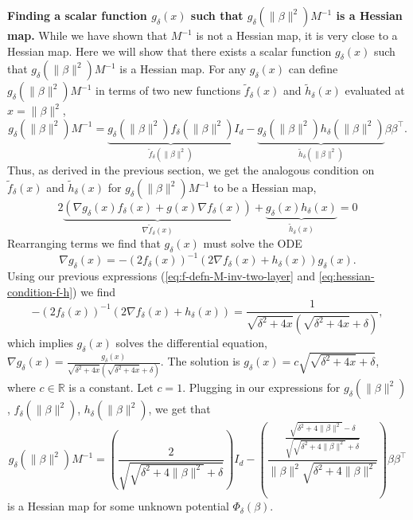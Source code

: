\documentclass{article}
\theoremstyle{plain}
\theoremstyle{definition}
\theoremstyle{remark}
\begin{document}
\textbf{Finding a scalar function $g_\delta(x)$ such that $g_\delta(\|\beta\|^2)M^{-1}$ is a Hessian map.}
%
While we have shown that $M^{-1}$ is not a Hessian map, it is very close to a Hessian map.
%
Here we will show that there exists a scalar function $g_\delta(x)$ such that $g_\delta\left(\|\beta\|^2\right)M^{-1}$ is a Hessian map.
%
For any $g_\delta(x)$ can define $g_\delta\left(\|\beta\|^2\right)M^{-1}$ in terms of two new functions $\tilde{f}_\delta(x)$ and $\tilde{h}_\delta(x)$ evaluated at $x = \|\beta\|^2$,
\begin{equation}
    g_\delta\left(\|\beta\|^2\right)M^{-1} = \underbrace{g_\delta\left(\|\beta\|^2\right)f_\delta\left(\|\beta\|^2\right)}_{\tilde{f}_\delta\left(\|\beta\|^2\right)}I_d - \underbrace{g_\delta\left(\|\beta\|^2\right)h_\delta\left(\|\beta\|^2\right)}_{\tilde{h}_\delta\left(\|\beta\|^2\right)}\beta\beta^\intercal.
\end{equation}
Thus, as derived in the previous section, we get the analogous condition on $\tilde{f}_\delta(x)$ and $\tilde{h}_\delta(x)$ for $g_\delta\left(\|\beta\|^2\right)M^{-1}$ to be a Hessian map,
\begin{equation}
    2 \underbrace{\left(\nabla g_\delta(x) f_\delta(x) + g(x)\nabla f_\delta(x)\right)}_{\nabla \tilde{f}_\delta(x)} + \underbrace{g_\delta(x)h_\delta(x)}_{\tilde{h}_\delta(x)} = 0
\end{equation}
Rearranging terms we find that $g_\delta(x)$ must solve the ODE
\begin{equation}
    \nabla g_\delta(x) = -\left(2f_\delta(x)\right)^{-1}\left(2\nabla f_\delta(x) + h_\delta(x)\right)g_\delta(x).
\end{equation}
Using our previous expressions (\cref{eq:f-defn-M-inv-two-layer} and \cref{eq:hessian-condition-f-h}) we find
\begin{equation}
-\left(2f_\delta(x)\right)^{-1}\left(2\nabla f_\delta(x) + h_\delta(x)\right) = \frac{1}{\sqrt{\delta^2 + 4x}(\sqrt{\delta^2 + 4x} + \delta)},
\end{equation}
which implies $g_\delta(x)$ solves the differential equation, $\nabla g_\delta(x) = \frac{g_\delta(x)}{\sqrt{\delta^2 + 4x}(\sqrt{\delta^2 + 4x} + \delta)}$.
%
The solution is $g_\delta(x) = c\sqrt{\sqrt{\delta^2 + 4x} + \delta}$, where $c \in \mathbb{R}$ is a constant.
%
Let $c = 1$.
%
Plugging in our expressions for $g_\delta\left(\|\beta\|^2\right)$, $f_\delta\left(\|\beta\|^2\right)$, $h_\delta\left(\|\beta\|^2\right)$, we get that
\begin{equation}
    \label{eq:g-m-inv-two-layer}
    g_\delta\left(\|\beta\|^2\right)M^{-1} = \left(\frac{2}{\sqrt{\sqrt{\delta^2 + 4\|\beta\|^2} + \delta}}\right)I_d - \left(\frac{\frac{\sqrt{\delta^2 + 4\|\beta\|^2} - \delta}{\sqrt{\sqrt{\delta^2 + 4\|\beta\|^2} + \delta}}}{\|\beta\|^2\sqrt{\delta^2 + 4\|\beta\|^2}}\right)\beta\beta^\intercal
\end{equation}
is a Hessian map for some unknown potential $\Phi_\delta(\beta)$.
\end{document}
